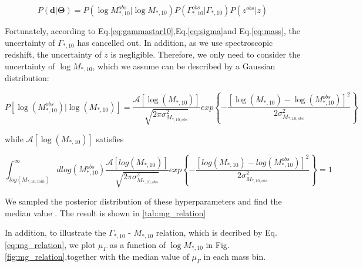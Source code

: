 \documentclass[fleqn,usenatbib]{mnras}
\begin{document}
\begin{equation}
    P(\mathbf{d}|\mathbf{\Theta}) = P(\log M^{obs}_{*,10}|\log M_{*,10})P(\Gamma^{obs}_{*,10}|\Gamma_{*,10})P(z^{obs}|z)
\end{equation}
\par Fortunately, according to Eq.\ref{eq:gammastar10},Eq.\ref{eq:sigma}and Eq.\ref{eq:mass}, the uncertainty of $\Gamma_{*,10}$ has cancelled out. In addition, as we use spectroscopic redshift, the uncertainty of $z$ is negligible. Therefore, we only need to consider the uncertainty of $\log M_{*,10}$, which we assume can be described by a Gaussian distribution:
\begin{tiny}
    \begin{equation}
        P[\log (M_{*,10}^{obs})|\log (M_{*,10})] = \frac{\mathcal{A}[\log (M_{*,10})]}{\sqrt{2\pi\sigma^2_{M_{*,10,obs}}}}exp\left\{-\frac{[\log (M_{*,10}) - \log (M_{*,10}^{obs})]^2}{2\sigma_{M_{*,10, obs}}^2}\right\}
    \end{equation}
\end{tiny}
while $\mathcal{A}[\log (M_{*,10})]$ satisfies
\begin{tiny}
    \begin{equation}
        \int_{log(M_{*,10,min})}^\infty dlog(M_{*,10}^{obs})\frac{\mathcal{A}[log(M_{*,10})]}{\sqrt{2\pi\sigma^2_{M_{*,10,obs}}}}exp\left\{-\frac{[log(M_{*,10}) - log(M_{*,10}^{obs})]^2}{2\sigma_{M_{*,10, obs}}^2}\right\} = 1 
    \end{equation}
\end{tiny}
\par We sampled the posterior distribution of these hyperparameters and find the median value . The result is shown in \ref{tab:mg_relation}
\begin{table}
    \centering
    \caption{Beyesian hierarchical model fitting for the $\Gamma_{*,10} - M_{*,10}$ relation in different redshift bins.}
    \label{tab:mg_relation}
\end{table}
In addition, to illustrate the $\Gamma_{*,10}$ - $M_{*,10}$ relation, which is decribed by Eq.\ref{eq:mg_relation}, we plot $\mu_\Gamma$ as a function of $\log M_{*,10}$ in Fig.\ref{fig:mg_relation},together with the median value of $\mu_\Gamma$ in each mass bin.
\end{document}
